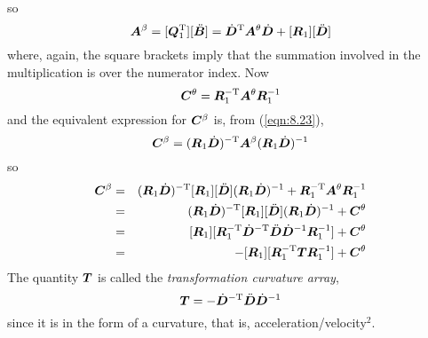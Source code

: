 so
\begin{displaymath}
\bA^{\beta} = [ \bQ_1 \trans ] [ \ddot \bB ] =
\dot \bD \trans \bA^{\theta} \dot \bD +
[ \bR_1 ] [ \ddot \bD ]
\end{displaymath}
where, again, the square brackets imply that the summation involved in
the multiplication is over the numerator index.
Now
\begin{displaymath}
\bC^{\theta} =
\bR_1 \invtrans \bA^{\theta} \bR_1^{-1}
\end{displaymath}
and the equivalent expression for ${\boldsymbol C}^{\beta} $ is, from (\ref{eqn:8.23}),
\begin{displaymath}
\bC^{\beta} =
( \bR_1 \dot \bD ) \invtrans \bA^{\beta}
( \bR_1 \dot \bD )^{-1}
\end{displaymath}
so
\begin{eqnarray}
  \bC^{\beta}&=&
  ( \bR_1 \dot \bD ) \invtrans [ \bR_1 ] [ \ddot \bD ]
  ( \bR_1 \dot \bD )^{-1} +
  \bR_1 \invtrans \bA^{\theta} \bR_1^{-1}\\
  \label{eqn:8.25}
  &=&
  ( \bR_1 \dot \bD ) \invtrans [ \bR_1 ] [ \ddot \bD ]
  ( \bR_1 \dot \bD )^{-1} +
  \bC^{\theta}\nonumber\\
  &=&
  [ \bR_1 ]
  [ \bR_1 \invtrans \dot \bD \invtrans \ddot \bD
  \dot \bD^{-1} \bR_1^{-1} ] +
  \bC^{\theta}\nonumber\\
  &=&
  - [ \bR_1 ] [ \bR_1 \invtrans \bT \bR_1^{-1} ] +
  \bC^{\theta}\nonumber
\end{eqnarray}
The quantity ${\boldsymbol T}$ is called the {\em transformation curvature array},
\begin{equation}
  \bT=- \dot \bD \invtrans \ddot \bD \dot \bD^{-1}
  \label{eqn:8.26}
\end{equation}
since it is in the form of a curvature, that is,
acceleration/velocity$^{2}$.

